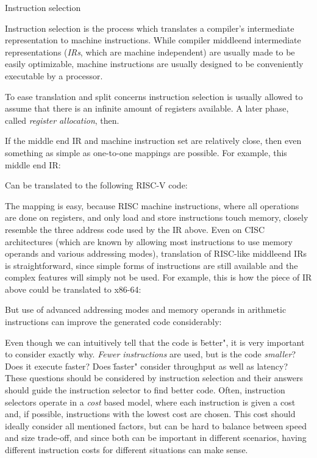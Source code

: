 \sec Instruction selection

Instruction selection is the process which translates a compiler's intermediate
representation to machine instructions. While compiler middleend intermediate
representations ({\em IRs}, which are machine independent) are usually made to
be easily optimizable, machine instructions are usually designed to be
conveniently executable by a processor.

To ease translation and split concerns instruction selection is usually allowed
to assume that there is an infinite amount of registers available. A later
phase, called {\em register allocation}, then.

If the middle end IR and machine instruction set are relatively close, then even
something as simple as one-to-one mappings are possible. For example, this
middle end IR:

Can be translated to the following RISC-V code:


The mapping is easy, because RISC machine instructions, where all operations are
done on registers, and only load and store instructions touch memory, closely
resemble the three address code used by the IR above. Even on CISC
architectures (which are known by allowing most instructions to use memory
operands and various addressing modes), translation of RISC-like middleend IRs
is straightforward, since simple forms of instructions are still available and
the complex features will simply not be used. For example, this is how the
piece of IR above could be translated to x86-64:

But use of advanced addressing modes and memory operands in arithmetic
instructions can improve the generated code considerably:

Even though we can intuitively tell that the code is \"better", it is very
important to consider exactly why. {\em Fewer instructions} are used, but is the code
{\em smaller}? Does it execute faster? Does \"faster" consider throughput as well
as latency? These questions should be considered by instruction selection and
their answers should guide the instruction selector to find better code. Often,
instruction selectors operate in a {\em cost} based model, where each
instruction is given a cost  and, if possible, instructions with the lowest cost
are chosen. This cost should ideally consider all mentioned factors, but can be
hard to balance between speed and size trade-off, and since both can be important
in different scenarios, having different instruction costs for different
situations can make sense.

